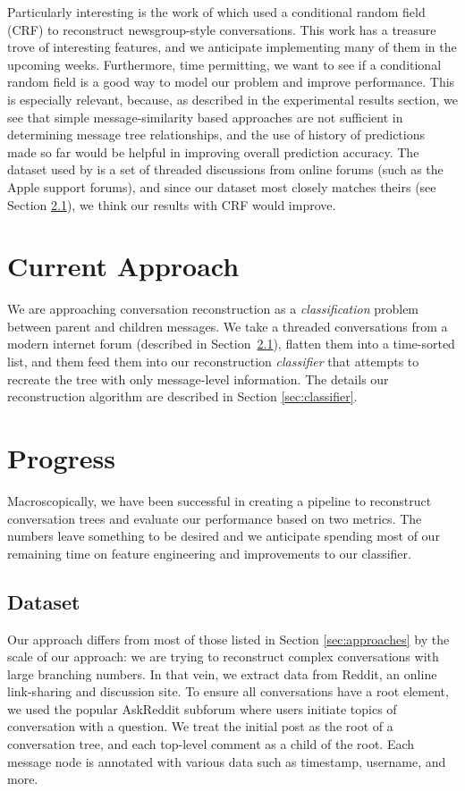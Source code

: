 \documentclass[10pt]{article}
\begin{document}
Particularly interesting is the work of \cite{Wang2011a} which used a conditional random
field (CRF) to reconstruct newsgroup-style conversations. This work has a treasure trove of
interesting features, and we anticipate implementing many of them in the upcoming weeks.
Furthermore, time permitting, we want to see if a conditional random field is a good way
to model our problem and improve performance. This is especially relevant, because, 
as described in the experimental results section, we see that simple message-similarity 
based approaches are not sufficient in determining message tree relationships, and 
the use of history of predictions made so far would be helpful in improving overall 
prediction accuracy. The dataset used by \cite{Wang2011a} is a set of threaded discussions 
from online forums (such as the Apple support forums), and since our dataset most 
closely matches theirs (see Section \ref{section:dataset}), we think our results with 
CRF would improve.

\section{Current Approach}
\label{sec:approach}
We are approaching conversation reconstruction as a \textit{classification} problem
between parent and children messages. We take a threaded conversations from a modern internet forum 
(described in Section~\ref{section:dataset}), flatten them into a time-sorted list, and them feed
them into our reconstruction \textit{classifier} that attempts to recreate the tree
with only message-level information. The details our reconstruction algorithm are 
described in Section \ref{sec:classifier}.

\section{Progress}
Macroscopically, we have
been successful in creating a pipeline to reconstruct conversation trees and
evaluate our performance based on two metrics. The numbers leave something to be desired and
we anticipate spending most of our remaining time on feature engineering and
improvements to our classifier.

\subsection{Dataset}
\label{section:dataset}
Our approach differs from most of those listed in Section \ref{sec:approaches}
by the scale of our approach: we are trying to reconstruct complex conversations
with large branching numbers.  In that vein, we extract data from Reddit, an
online link-sharing and discussion site. To ensure all conversations have a root
element, we used the popular AskReddit subforum where 
users initiate topics of conversation with a question. We treat the
initial post as the root of a conversation tree, and each top-level comment as a
child of the root. Each message node is annotated with various data such as
timestamp, username, and more.
\end{document}
